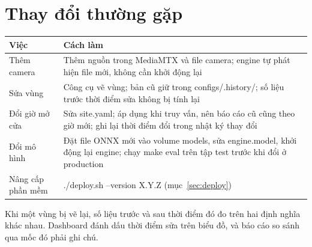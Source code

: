 \documentclass[10pt,a4paper,oneside,openany]{report}
\newcommand{\breakus}{\textunderscore\allowbreak}
\newcommand{\file}[1]{{\ttfamily\let\_\breakus #1}}
\newcommand{\code}[1]{{\ttfamily\let\_\breakus #1}}
\newcommand{\tabhead}[1]{\textsf{\bfseries\color{ink}#1}}
\newenvironment{bang}{\par\small\rowcolors{2}{rowgray}{white}}{\par\vspace{0.3em}}
\begin{document}
\section{Thay đổi thường gặp}
\begin{bang}
\begin{tabularx}{\linewidth}{L{36mm}Y}
\toprule
\tabhead{Việc} & \tabhead{Cách làm} \\
\midrule
Thêm camera & Thêm nguồn trong MediaMTX và file camera; engine tự phát hiện file mới, không cần khởi động lại \\
Sửa vùng & Công cụ vẽ vùng; bản cũ giữ trong \file{configs/.history/}; số liệu trước thời điểm sửa không bị tính lại \\
Đổi giờ mở cửa & Sửa \file{site.yaml}; áp dụng khi truy vấn, nên báo cáo cũ cũng theo giờ mới; ghi lại thời điểm đổi trong nhật ký thay đổi \\
Đổi mô hình & Đặt file ONNX mới vào volume \file{models}, sửa \code{engine.model}, khởi động lại engine; chạy \code{make eval} trên tập test trước khi đổi ở production \\
Nâng cấp phần mềm & \code{./deploy.sh --version X.Y.Z} (mục~\ref{sec:deploy}) \\
\bottomrule
\end{tabularx}
\end{bang}

\begin{chuy}
Khi một vùng bị vẽ lại, số liệu trước và sau thời điểm đó đo trên hai định nghĩa khác nhau. Dashboard đánh dấu thời điểm sửa trên biểu đồ,
và báo cáo so sánh qua mốc đó phải ghi chú.
\end{chuy}
\end{document}
